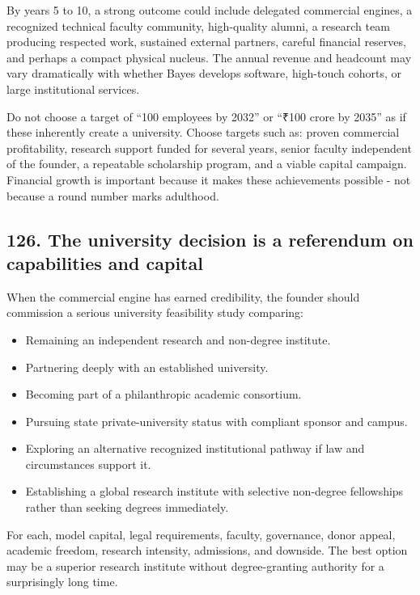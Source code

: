 By years 5 to 10, a strong outcome could include delegated commercial engines, a recognized technical faculty community, high-quality alumni, a research team producing respected work, sustained external partners, careful financial reserves, and perhaps a compact physical nucleus. The annual revenue and headcount may vary dramatically with whether Bayes develops software, high-touch cohorts, or large institutional services.

Do not choose a target of ``100 employees by 2032'' or ``\textnormal{₹}100 crore by 2035'' as if these inherently create a university. Choose targets such as: proven commercial profitability, research support funded for several years, senior faculty independent of the founder, a repeatable scholarship program, and a viable capital campaign. Financial growth is important because it makes these achievements possible - not because a round number marks adulthood.

\subsection{126. The university decision is a referendum on capabilities and capital}

When the commercial engine has earned credibility, the founder should commission a serious university feasibility study comparing:

\begin{itemize}[leftmargin=*,itemsep=1.5pt]
  \item Remaining an independent research and non-degree institute.
  \item Partnering deeply with an established university.
  \item Becoming part of a philanthropic academic consortium.
  \item Pursuing state private-university status with compliant sponsor and campus.
  \item Exploring an alternative recognized institutional pathway if law and circumstances support it.
  \item Establishing a global research institute with selective non-degree fellowships rather than seeking degrees immediately.
\end{itemize}

For each, model capital, legal requirements, faculty, governance, donor appeal, academic freedom, research intensity, admissions, and downside. The best option may be a superior research institute without degree-granting authority for a surprisingly long time.

